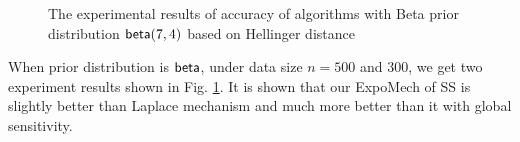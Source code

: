 \begin{figure}
\begin{center}
\centering
\caption{The experimental results of accuracy of algorithms with Beta prior distribution $\mathsf{beta}(7,4)$ based on Hellinger distance}
\label{fig_beta_hellinger}
\end{center}
\end{figure}
When prior distribution is $\mathsf{beta}$, under data size $n = 500$ and $300$, we get two experiment results shown in Fig. \ref{fig_beta_hellinger}. It is shown that our ExpoMech of SS is slightly better than Laplace mechanism and much more better than it with global sensitivity.

